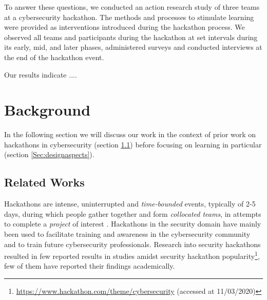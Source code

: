 \documentclass[runningheads]{llncs}
\begin{document}
To answer these questions, we conducted an action research study of three teams at a cybersecurity hackathon. The methods and processes to stimulate learning were provided as interventions introduced during the hackathon process. We observed all teams and participants during the hackathon at set intervals during its early, mid, and later phases, administered surveys and conducted interviews at the end of the hackathon event.

Our results indicate ....

\section{Background}
In the following section we will discuss our work in the context of prior work on hackathons in cybersecurity (section \ref{Sec:relatedworks}) before focusing on learning in particular (section \ref{Sec:designaspects}).

\subsection{Related Works}\label{Sec:relatedworks}
Hackathons are intense, uninterrupted and \textit{time-bounded} events, typically of 2-5 days, during which people gather together and form \textit{collocated teams}, in attempts to complete a \textit{project} of interest \cite{nolte2018you,komssi2015hackathons}. Hackathons in the security domain have mainly been used to facilitate training and awareness in the cybersecurity community and to train future cybersecurity professionals. Research into security hackathons resulted in few reported results in studies amidst security hackathon popularity\footnote{\url{https://www.hackathon.com/theme/cybersecurity} (accessed at 11/03/2020)}, few of them have reported their findings academically. 
\end{document}

